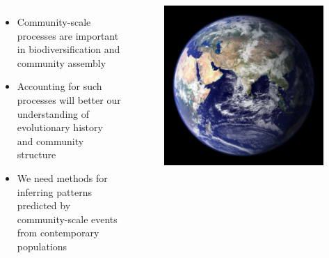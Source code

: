 {
\begin{frame}
    \begin{columns}[c]
        {
        \begin{itemize}
            \item<2-> Community-scale processes are important in
                biodiversification and community assembly
            \item<3-> Accounting for such processes will better our
                understanding of evolutionary history and
                community structure
            \item<4-> We need methods for inferring patterns predicted by
                community-scale events from contemporary populations
        \end{itemize}
        }
        \begin{figure}
            \begin{center}
            \includegraphics[width=\textwidth]{../images/earth-image.jpg}
            \end{center}
        \end{figure}
    \end{columns}
\end{frame}
}

